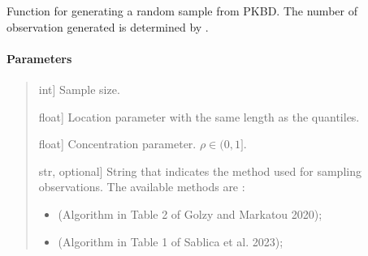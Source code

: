 \documentclass[letterpaper,10pt,english,openany,oneside]{sphinxmanual}
\begin{document}

\begin{fulllineitems}
\label{\detokenize{api_reference/generated/QuadratiK.spherical_clustering.PKBD:QuadratiK.spherical_clustering.PKBD.rpkb}}
\pysigstartsignatures
{}
\pysigstopsignatures
\sphinxAtStartPar
Function for generating a random sample from PKBD. 
The number of observation generated is determined by .


\paragraph{Parameters}
\label{\detokenize{api_reference/generated/QuadratiK.spherical_clustering.PKBD:id1}}\begin{quote}
\begin{description}
\sphinxlineitem{n}{[}int{]}
\sphinxAtStartPar
Sample size.

\sphinxlineitem{mu}{[}float{]}
\sphinxAtStartPar
Location parameter with the same length as the quantiles.

\sphinxlineitem{rho}{[}float{]}
\sphinxAtStartPar
Concentration parameter. \(\rho \in (0,1]\).

\sphinxlineitem{method}{[}str, optional{]}
\sphinxAtStartPar
String that indicates the method used for sampling observations. 
The available methods are :
\begin{itemize}
\item {} \begin{description}
\sphinxAtStartPar
(Algorithm in Table 2 of Golzy and Markatou 2020);

\end{description}

\item {} \begin{description}
\sphinxAtStartPar
(Algorithm in Table 1 of Sablica et al. 2023);


\end{description}
\end{itemize}
\end{description}
\end{quote}
\end{fulllineitems}
\end{document}
